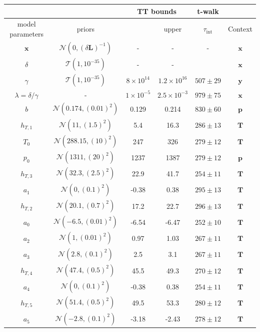 \begin{table}
	\centering
	\begin{tabular}{ |c||c|c|c|c|c|   }
		\hline
		& &\multicolumn{2}{|c|}{TT bounds}& t-walk&\\
		\hline
		model parameters& priors&\makecell{lower}& \makecell{upper\\
		}&$\tau_{\text{int}}$&Context\\
		\hhline{|=||=|=|=|=|=|}
		$\bm{x}$ &$\mathcal{N}(0,(\delta \bm{L})^{-1})$ & -&-&-& $\bm{x}$\\ \hline
		$\delta$ &$\mathcal{T}(1,10^{-35})$ & -&-&  & $\bm{x}$\\ \hline
		$\gamma$ & $\mathcal{T}(1,10^{-35})$ &$8\times10^{14}$ &$1.2\times10^{16}$&  $ 507\pm 29$ &$\bm{y}$\\ \hline
		$\lambda  = \delta / \gamma$ &- & $1\times10^{-5}$&$2.5\times10^{-3}$& $979 \pm 75$ &$\bm{x}$\\ \hline
		$b$ &  $\mathcal{N}(0.174,(0.01)^2)$& 0.129& 0.214 &$830\pm 60$&$\bm{p}$\\ \hline
		$h_{T,1}$ &  $\mathcal{N}(11,(1.5)^2)$&5.4 &16.3&$286\pm 13$ &$\bm{T}$\\ \hline
		$T_{0}$ &  $\mathcal{N}(288.15,(10)^2)$& 247 &326&$279 \pm 12$&$\bm{T}$\\ \hline
		$p_0$ &  $\mathcal{N}(1311,(20)^2)$&1237 &1387&$279\pm 12$&$\bm{p}$\\ \hline
		$h_{T,3}$ &  $\mathcal{N}(32.3,(2.5)^2)$&22.9&41.7&$254\pm 11$&$\bm{T}$\\ \hline
		$a_{1}$ &  $\mathcal{N}(0,(0.1)^2)$&-0.38 &0.38&$295 \pm 13$&$\bm{T}$\\ \hline
		$h_{T,2}$ &  $\mathcal{N}(20.1,(0.7)^2)$&17.2 &22.7&$296\pm 13$&$\bm{T}$\\ \hline
		$a_{0}$ &  $\mathcal{N}(-6.5,(0.01)^2)$&-6.54 &-6.47&$252 \pm 10$&$\bm{T}$\\ \hline
		$a_{2}$ &  $\mathcal{N}(1,(0.01)^2)$&0.97 &1.03&$267 \pm 11$&$\bm{T}$\\ \hline
		$a_{3}$ &  $\mathcal{N}(2.8,(0.1)^2)$&2.5 &3.1&$267\pm 11$&$\bm{T}$\\ \hline
		$h_{T,4}$ &  $\mathcal{N}(47.4,(0.5)^2)$&45.5 &49.3&$270 \pm 12$&$\bm{T}$\\ \hline
		$a_{4}$ &  $\mathcal{N}(0,(0.1)^2)$&-0.38 &0.38&$254 \pm 11$&$\bm{T}$\\ \hline
		$h_{T,5}$ &  $\mathcal{N}(51.4,(0.5)^2)$&49.5 &53.3&$280 \pm 12$&$\bm{T}$\\ \hline
		$a_{5}$ &  $\mathcal{N}(-2.8,(0.1)^2)$&-3.18 &-2.43&$278 \pm 12$&$\bm{T}$\\ \hline

\end{tabular}
\end{table}
